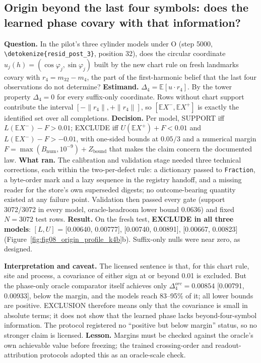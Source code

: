 \documentclass[11pt,a4paper]{article}
\newcommand{\E}{\mathbb{E}}
\DeclareRobustCommand{\_}{\ifmmode\origunderscore\else\textunderscore\allowbreak\fi}
\DeclareRobustCommand{\fpath}[1]{\begingroup\small\expandafter\nolinkurl\expandafter{\detokenize{#1}}\endgroup}
\begin{document}
\subsection{Origin beyond the last four symbols: does the learned phase covary with that information?}
\textbf{Question.} In the pilot's three cylinder models under O (step 5000, \fpath{resid_post_3}, position 32), does
the circular coordinate $u_j(h)=(\cos\varphi_j,\sin\varphi_j)$ built by the new chart rule on fresh
landmarks covary with $r_4=m_{32}-m_4$, the part of the first-harmonic belief that the last four
observations do not determine? \textbf{Estimand.} $\Delta_4=\E[u\cdot r_4]$. By the tower property
$\Delta_4=0$ for every suffix-only coordinate. Rows without chart support contribute the interval
$[-\|r_4\|,+\|r_4\|]$, so $[\E X^-,\E X^+]$ is exactly the identified set over all completions.
\textbf{Decision.} Per model, SUPPORT iff $L(\E X^-)-F>0.01$; EXCLUDE iff $U(\E X^+)+F<0.01$ and
$L(\E X^-)-F>-0.01$, with one-sided bounds at $0.05/3$ and a numerical margin
$F=\max(B_{\mathrm{num}},10^{-9})+Z_{\mathrm{bound}}$ that makes the claim concern the documented
law. \textbf{What ran.} The calibration and validation stage needed three technical
corrections, each within the two-per-defect rule: a dictionary passed to \texttt{Fraction}, a
byte-order mark and a lazy sequence in the registry handoff, and a missing reader for the
store's own superseded digests; no outcome-bearing quantity existed at any failure point.
Validation then passed every gate (support 3072/3072 in every model, oracle-headroom lower
bound 0.0636) and fixed $N=3072$ test rows. \textbf{Result.} On the fresh test,
\textbf{EXCLUDE in all three models}: $[L,U]$ = [0.00640, 0.00777], [0.00740, 0.00891],
[0.00667, 0.00823] (Figure~\ref{fig:fig08_origin_profile_k4b}b). Suffix-only nulls were near zero,
as designed.

\textbf{Interpretation and caveat.} The licensed sentence is that, for this chart rule, site and
process, a covariance of either sign at or beyond 0.01 is excluded. But the phase-only oracle
comparator itself achieves only $\Delta_4^{orc}=0.00854$ [0.00791, 0.00933], below the margin, and
the models reach 83--95\% of it; all lower bounds are positive. EXCLUSION therefore means only
that the covariance is small in absolute terms; it does not show that the learned phase lacks
beyond-four-symbol information.
The protocol registered no ``positive but below margin'' status, so no stronger claim is licensed.
\textbf{Lesson.} Margins must be checked against the oracle's own achievable value before
freezing; the trained crossing-order and readout-attribution protocols adopted this as an
oracle-scale check.
\end{document}
